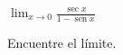 \item $\displaystyle \lim_{x \to 0} \frac{\sec x}{1 - \operatorname{sen} x}$
\par
Encuentre el límite.

